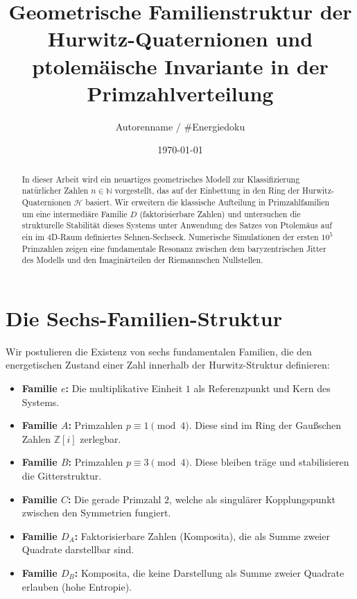 \documentclass[11pt,a4paper]{article}
\title{\textbf{Geometrische Familienstruktur der Hurwitz-Quaternionen und ptolemäische Invariante in der Primzahlverteilung}}
\author{Autorenname / #Energiedoku}
\date{\today}
\begin{document}
	
	\maketitle
	
	\begin{abstract}
		In dieser Arbeit wird ein neuartiges geometrisches Modell zur Klassifizierung natürlicher Zahlen $n \in \mathbb{N}$ vorgestellt, das auf der Einbettung in den Ring der Hurwitz-Quaternionen $\mathcal{H}$ basiert. Wir erweitern die klassische Aufteilung in Primzahlfamilien um eine intermediäre Familie $D$ (faktorisierbare Zahlen) und untersuchen die strukturelle Stabilität dieses Systems unter Anwendung des Satzes von Ptolemäus auf ein im 4D-Raum definiertes Sehnen-Sechseck. Numerische Simulationen der ersten $10^5$ Primzahlen zeigen eine fundamentale Resonanz zwischen dem baryzentrischen Jitter des Modells und den Imaginärteilen der Riemannschen Nullstellen.
	\end{abstract}
	
	\section{Die Sechs-Familien-Struktur}
	Wir postulieren die Existenz von sechs fundamentalen Familien, die den energetischen Zustand einer Zahl innerhalb der Hurwitz-Struktur definieren:
	
	\begin{itemize}
		\item \textbf{Familie $e$:} Die multiplikative Einheit $1$ als Referenzpunkt und Kern des Systems.
		\item \textbf{Familie $A$:} Primzahlen $p \equiv 1 \pmod 4$. Diese sind im Ring der Gaußschen Zahlen $\mathbb{Z}[i]$ zerlegbar.
		\item \textbf{Familie $B$:} Primzahlen $p \equiv 3 \pmod 4$. Diese bleiben träge und stabilisieren die Gitterstruktur.
		\item \textbf{Familie $C$:} Die gerade Primzahl $2$, welche als singulärer Kopplungspunkt zwischen den Symmetrien fungiert.
		\item \textbf{Familie $D_A$:} Faktorisierbare Zahlen (Komposita), die als Summe zweier Quadrate darstellbar sind.
		\item \textbf{Familie $D_B$:} Komposita, die keine Darstellung als Summe zweier Quadrate erlauben (hohe Entropie).
	\end{itemize}
	
\end{document}
